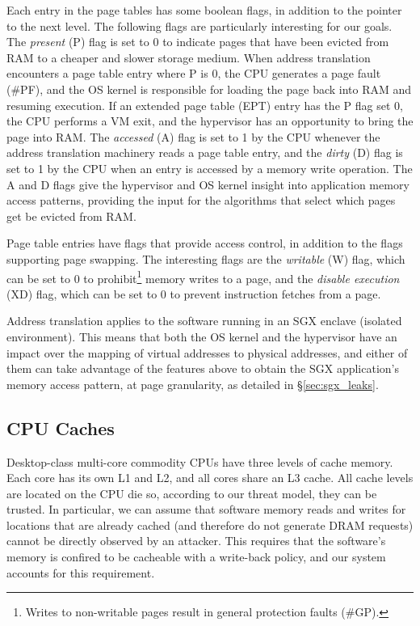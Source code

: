 Each entry in the page tables has some boolean flags, in addition to the
pointer to the next level. The following flags are particularly interesting for
our goals. The \textit{present} (P) flag is set to 0 to indicate pages that
have been evicted from RAM to a cheaper and slower storage medium. When address
translation encounters a page table entry where P is 0, the CPU generates a
page fault (\#PF), and the OS kernel is responsible for loading the page back
into RAM and resuming execution. If an extended page table (EPT) entry has the
P flag set 0, the CPU performs a VM exit, and the hypervisor has an opportunity
to bring the page into RAM. The \textit{accessed} (A) flag is set to 1 by the
CPU whenever the address translation machinery reads a page table entry, and
the \textit{dirty} (D) flag is set to 1 by the CPU when an entry is accessed by
a memory write operation. The A and D flags give the hypervisor and OS kernel
insight into application memory access patterns, providing the input for the
algorithms that select which pages get be evicted from RAM.

Page table entries have flags that provide access control, in addition to the
flags supporting page swapping. The interesting flags are the \textit{writable}
(W) flag, which can be set to 0 to prohibit\footnote{Writes to non-writable
pages result in general protection faults (\#GP).} memory writes to a page, and
the \textit{disable execution} (XD) flag, which can be set to 0 to prevent
instruction fetches from a page.

Address translation applies to the software running in an SGX enclave
(isolated environment). This means that both the OS kernel and the hypervisor
have an impact over the mapping of virtual addresses to physical addresses, and
either of them can take advantage of the features above to obtain the SGX
application's memory access pattern, at page granularity, as detailed in
\S \ref{sec:sgx_leaks}.


\subsection{CPU Caches}
\label{sec:caching}

Desktop-class multi-core commodity CPUs have three levels of cache memory. Each
core has its own L1 and L2, and all cores share an L3 cache. All cache levels
are located on the CPU die so, according to our threat model, they can be
trusted. In particular, we can assume that software memory reads and writes for
locations that are already cached (and therefore do not generate DRAM requests)
cannot be directly observed by an attacker. This requires that the software's
memory is confired to be cacheable with a write-back policy, and our system
accounts for this requirement.

